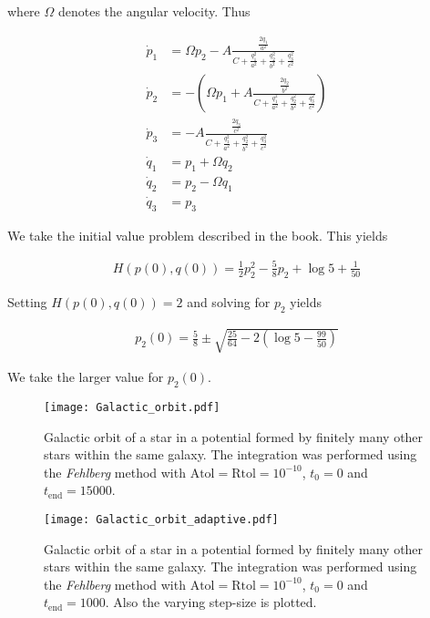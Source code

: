 where $\Omega$ denotes the angular velocity. Thus

\begin{align*}
	\dot{p}_1 &= \Omega p_2 -  A \frac{\frac{2q_1}{a^2}}{C + \frac{q_1^2}{a^2} + \frac{q_2^2}{b^2} + \frac{q_3^2}{c^2}}\\
	\dot{p}_2 &= - \left(\Omega p_1 + A \frac{\frac{2q_2}{b^2}}{C + \frac{q_1^2}{a^2} + \frac{q_2^2}{b^2} + \frac{q_3^2}{c^2}}\right)\\
	\dot{p}_3 &= -A \frac{\frac{2q_3}{c^2}}{C + \frac{q_1^2}{a^2} + \frac{q_2^2}{b^2} + \frac{q_3^2}{c^2}}\\
	\dot{q}_1 &= p_1 + \Omega q_2\\
	\dot{q}_2 &= p_2 - \Omega q_1\\
	\dot{q}_3 &= p_3
\end{align*}

We take the initial value problem described in the book. This yields

\begin{gather}
	H(p(0),q(0)) = \frac{1}{2}p_2^2 - \frac{5}{8} p_2 + \log 5 + \frac{1}{50}  
\end{gather}

Setting $H(p(0), q(0)) = 2$ and solving for $p_2$ yields

\begin{gather}
	p_2(0) = \frac{5}{8} \pm \sqrt{\frac{25}{64} - 2\left( \log 5 - \frac{99}{50}\right)} 
\end{gather}

We take the larger value for $p_2(0)$.

\begin{figure}[h!tb]
	\centering
	\texttt{[image: Galactic\_orbit.pdf]}
	\caption[Galactic orbit]{Galactic orbit of a star in a potential formed by finitely many other stars within the same galaxy. The integration was performed using the \emph{Fehlberg} method with $\mathrm{Atol} = \mathrm{Rtol} = 10^{-10}$, $t_0 = 0$ and $t_{\mathrm{end}} = 15000$.}
\end{figure}

\begin{figure}[h!tb]
	\centering
	\texttt{[image: Galactic\_orbit\_adaptive.pdf]}
	\caption[Galactic orbit adaptive]{Galactic orbit of a star in a potential formed by finitely many other stars within the same galaxy. The integration was performed using the \emph{Fehlberg} method with $\mathrm{Atol} = \mathrm{Rtol} = 10^{-10}$, $t_0 = 0$ and $t_{\mathrm{end}} = 1000$. Also the varying step-size is plotted.}
\end{figure}

